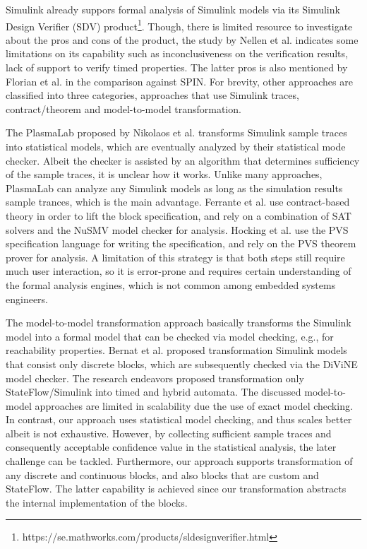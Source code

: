 Simulink already suppors formal analysis of Simulink models via its Simulink Design Verifier (SDV) product\footnote{https://se.mathworks.com/products/sldesignverifier.html}. Though, there is limited resource to investigate about the pros and cons of the product, the study by Nellen et al. \cite{Nellen2018FormalRecommendations} indicates some limitations on its capability such as inconclusiveness on the verification results, lack of support to verify timed properties. The latter pros is also mentioned by Florian et al. \cite{Leitner2008SimulinkStudy} in the comparison against SPIN. For brevity, other approaches are classified into three categories, approaches that use Simulink traces, contract/theorem and model-to-model transformation. 

The PlasmaLab proposed by Nikolaos et al. \cite{Kekatos2018ConstructingHybridization} transforms Simulink sample traces into statistical models, which are eventually analyzed by their statistical mode checker. Albeit the checker is assisted by an algorithm that determines sufficiency of the sample traces, it is unclear how it works. Unlike many approaches, PlasmaLab can analyze any Simulink models as long as the simulation results sample trances, which is the main advantage. Ferrante et al. \cite{Hocking2016ProvingModels} use contract-based theory in order to lift the block specification, and rely on a combination of SAT solvers and the NuSMV model checker for analysis. Hocking et al. \cite{Ferrante2012ParallelSystems} use the PVS specification language for writing the specification, and rely on the PVS theorem prover for analysis. A limitation of this strategy is that both steps still require much user interaction, so it is error-prone and requires certain understanding of the formal analysis engines, which is not common among embedded systems engineers.

The model-to-model transformation approach basically transforms the Simulink model into a formal model that can be checked via model checking, e.g., for reachability properties. Bernat et al. \cite{Meenakshi2006ToolChecker} proposed transformation Simulink models that consist only discrete blocks, which are subsequently checked via the DiViNE model checker. The research endeavors proposed transformation only StateFlow/Simulink into timed and hybrid automata. The discussed model-to-model approaches are limited in scalability due the use of exact model checking. In contrast, our approach uses statistical model checking, and thus scales better albeit is not exhaustive. However, by collecting sufficient sample traces and consequently acceptable confidence value in the statistical analysis, the later challenge can be tackled. Furthermore, our approach supports transformation of any discrete and continuous blocks, and also blocks that are custom and StateFlow. The latter capability is achieved since our transformation abstracts the internal implementation of the blocks.



